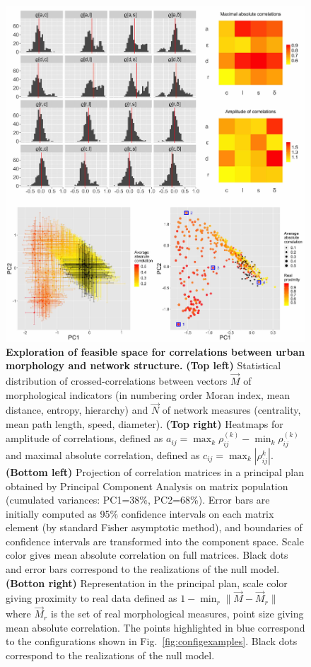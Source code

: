 \documentclass{article}
\newcommand{\norm}[1]{\| #1 \|}
\begin{document}
\begin{figure}%
\includegraphics[width=\linewidth]{Fig2.jpg}
\caption{\textbf{Exploration of feasible space for correlations between urban morphology and network structure.} \textbf{(Top left)} Statistical distribution of crossed-correlations between vectors $\vec{M}$ of morphological indicators (in numbering order Moran index, mean distance, entropy, hierarchy) and $\vec{N}$ of network measures (centrality, mean path length, speed, diameter). \textbf{(Top right)} Heatmaps for amplitude of correlations, defined as $a_{ij}=\max_k{\rho_{ij}^{(k)}}-\min_k{\rho_{ij}^{(k)}}$ and maximal absolute correlation, defined as $c_{ij}=\max_k\left| \rho_{ij}^{k} \right|$. \textbf{(Bottom left)} Projection of correlation matrices in a principal plan obtained by Principal Component Analysis on matrix population (cumulated variances: PC1=38\%, PC2=68\%). Error bars are initially computed as 95\% confidence intervals on each matrix element (by standard Fisher asymptotic method), and boundaries of confidence intervals are transformed into the component space. Scale color gives mean absolute correlation on full matrices. Black dots and error bars correspond to the realizations of the null model. \textbf{(Botton right)} Representation in the principal plan, scale color giving proximity to real data defined as $1 - \min_r \norm{\vec{M}-\vec{M}_r}$ where $\vec{M}_r$ is the set of real morphological measures, point size giving mean absolute correlation. The points highlighted in blue correspond to the configurations shown in Fig.~\ref{fig:configexamples}. Black dots correspond to the realizations of the null model.\label{fig:densnwcor}}
\end{figure}
\end{document}
